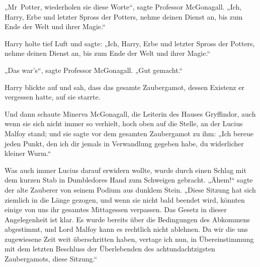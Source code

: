 „Mr~Potter, wiederholen sie diese Worte“, sagte Professor McGonagall.
„Ich, Harry, Erbe und letzter Spross der Potters, nehme deinen Dienst an, bis zum Ende der Welt und ihrer Magie.“

Harry holte tief Luft und sagte:
„Ich, Harry, Erbe und letzter Spross der Potters, nehme deinen Dienst an, bis zum Ende der Welt und ihrer Magie.“

„Das war’s“, sagte Professor McGonagall.
„Gut gemacht.“

Harry blickte auf und sah, dass das gesamte Zaubergamot, dessen Existenz er vergessen hatte, auf sie starrte.

Und dann schaute Minerva McGonagall, die Leiterin des Hauses Gryffindor, auch wenn sie sich nicht immer so verhielt, hoch oben auf die Stelle, an der Lucius Malfoy stand; und sie sagte vor dem gesamten Zaubergamot zu ihm:
„Ich bereue jeden Punkt, den ich dir jemals in Verwandlung gegeben habe, du widerlicher kleiner Wurm.“

Was auch immer Lucius darauf erwidern wollte, wurde durch einen Schlag mit dem kurzen Stab in Dumbledores Hand zum Schweigen gebracht. „Ähem!“ sagte der alte Zauberer von seinem Podium aus dunklem Stein.
„Diese Sitzung hat sich ziemlich in die Länge gezogen, und wenn sie nicht bald beendet wird, könnten einige von uns ihr gesamtes Mittagessen verpassen. Das Gesetz in dieser Angelegenheit ist klar. Es wurde bereits über die Bedingungen des Abkommens abgestimmt, und Lord Malfoy kann es rechtlich nicht ablehnen. Da wir die uns zugewiesene Zeit weit überschritten haben, vertage ich nun, in Übereinstimmung mit dem letzten Beschluss der Überlebenden des achtundachtzigsten Zaubergamots, diese Sitzung.“

